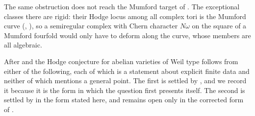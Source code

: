 \begin{remark}
The same obstruction does not reach the Mumford target of
. The exceptional classes there are rigid: their Hodge
locus among all complex tori is the Mumford curve (,
), so a semiregular complex with Chern character
$N\omega$ on the square of a Mumford fourfold would only have to deform along
the curve, whose members are all algebraic.
\end{remark}

\begin{remark}
\label{rem:tworemain}
After  and  the Hodge
conjecture for abelian varieties of Weil type follows from either of the
following, each of which is a statement about explicit finite data and neither
of which mentions a general point. The first is settled by
, and we record it because it is the form in which the
question first presents itself. The second is settled by 
in the form stated here, and remains open only in the corrected form of
.


\end{remark}
